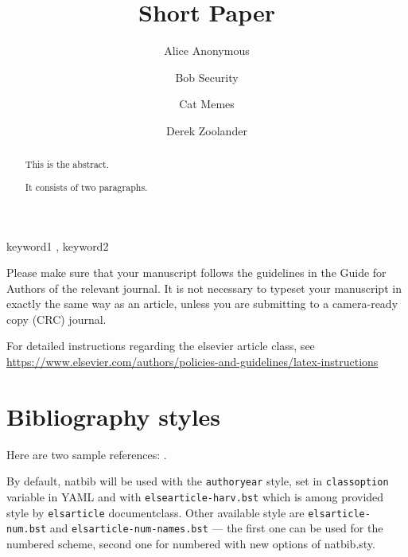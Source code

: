 \documentclass[preprint, 3p,
authoryear]{elsarticle} %
\begin{document}
\begin{frontmatter}

  \title{Short Paper}
    \author[Some Institute of Technology]{Alice Anonymous%
  }
    \author[Another University]{Bob Security%
  }
    \author[Another University]{Cat Memes%
  }
    \author[Some Institute of Technology]{Derek Zoolander%
  }
  
  \begin{abstract}
  This is the abstract.

  It consists of two paragraphs.
  \end{abstract}
    \begin{keyword}
    keyword1 \sep 
    keyword2
  \end{keyword}
  
 \end{frontmatter}

Please make sure that your manuscript follows the guidelines in the
Guide for Authors of the relevant journal. It is not necessary to
typeset your manuscript in exactly the same way as an article, unless
you are submitting to a camera-ready copy (CRC) journal.

For detailed instructions regarding the elsevier article class, see
\url{https://www.elsevier.com/authors/policies-and-guidelines/latex-instructions}

\section{Bibliography styles}\label{bibliography-styles}

Here are two sample references: \citep{Feynman1963118, Dirac1953888}.

By default, natbib will be used with the \texttt{authoryear} style, set
in \texttt{classoption} variable in YAML and with
\texttt{elsearticle-harv.bst} which is among provided style by
\texttt{elsarticle} documentclass. Other available style are
\texttt{elsarticle-num.bst} and \texttt{elsarticle-num-names.bst} ---
the first one can be used for the numbered scheme, second one for
numbered with new options of natbib.sty.
\end{document}
